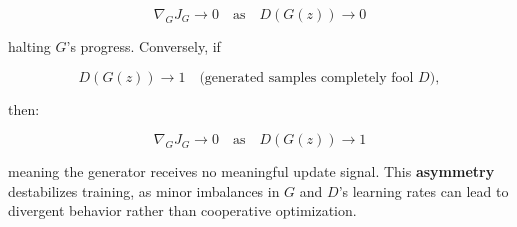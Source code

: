 \begin{equation}
\nabla_G J_G \to 0 \quad \text{as} \quad D(G(z)) \to 0
\end{equation}

halting \(G\)'s progress. Conversely, if 

\begin{equation}
D(G(z)) \to 1 \quad \text{(generated samples completely fool \(D\))},
\end{equation}

then:

\begin{equation}
\nabla_G J_G \to 0 \quad \text{as} \quad D(G(z)) \to 1
\end{equation}

meaning the generator receives no meaningful update signal. This \textbf{asymmetry} destabilizes training, as minor imbalances in \(G\) and \(D\)'s learning rates can lead to divergent behavior rather than cooperative optimization.